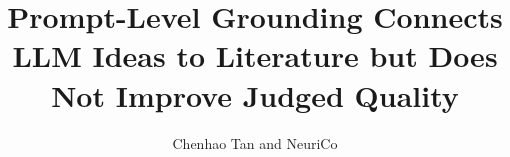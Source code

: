 \documentclass{article}
\title{Prompt-Level Grounding Connects LLM Ideas to Literature but Does Not Improve Judged Quality}
\author{Chenhao Tan and NeuriCo}
\begin{document}
\maketitle

\begin{abstract}

\end{abstract}









\end{document}
